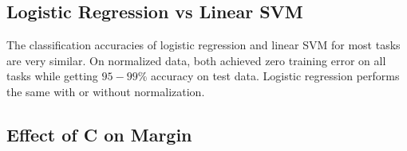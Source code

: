 \documentclass[10pt,twoside]{article}
\begin{document}
\subsection{Logistic Regression vs Linear SVM}
The classification accuracies of logistic regression and linear SVM for most tasks are very similar. On normalized data, both achieved zero training error on all tasks while getting $95-99\%$ accuracy on test data.
Logistic regression performs the same with or without normalization.

\subsection{Effect of C on Margin}

\vfill
\end{document}

